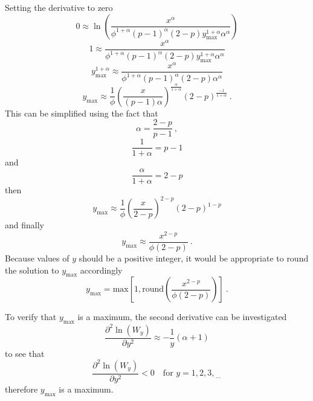 \documentclass[12pt, a4paper]{memoir}
\newcommand{\dotdotdot}{_{\phantom{.}\cdots}}
\begin{document}
Setting the derivative to zero
\begin{equation*}
0 \approx \ln\left(
\frac{x^\alpha}{\phi^{1+\alpha}(p-1)^\alpha(2-p)y_{\text{max}}^{1+\alpha}\alpha^\alpha}
\right)
\end{equation*}
\begin{equation*}
1 \approx 
\frac{x^\alpha}{\phi^{1+\alpha}(p-1)^\alpha(2-p)y_{\text{max}}^{1+\alpha}\alpha^\alpha}
\end{equation*}
\begin{equation*}
y_{\text{max}}^{1+\alpha} \approx 
\frac{x^\alpha}{\phi^{1+\alpha}(p-1)^\alpha(2-p)\alpha^\alpha}
\end{equation*}
\begin{equation*}
y_{\text{max}} \approx 
\frac{1}{\phi}
\left(
	\frac{x}{(p-1)\alpha}
\right)^{\frac{\alpha}{1+\alpha}}
(2-p)^{\frac{-1}{1+\alpha}} \ .
\end{equation*}
This can be simplified using the fact that 
\begin{equation*}
\alpha=\frac{2-p}{p-1} \ ,
\end{equation*}
\begin{equation*}
\frac{1}{1+\alpha} = p-1
\end{equation*}
and
\begin{equation*}
\frac{\alpha}{1+\alpha} = 2-p
\end{equation*}
then
\begin{equation*}
y_{\text{max}} \approx 
\frac{1}{\phi}
\left(
	\frac{x}{2-p}
\right)^{2-p}
(2-p)^{1-p}
\end{equation*}
and finally
\begin{equation}
y_{\text{max}} \approx \frac{x^{2-p}}{\phi(2-p)} \ .
\end{equation}
Because values of $y$ should be a positive integer, it would be appropriate to round the solution to $y_\text{max}$ accordingly
\begin{equation}
y_{\text{max}} = \text{max}\left[
1,\text{round}\left(\frac{x^{2-p}}{\phi(2-p)}\right)
\right] \ .
\end{equation}

To verify that $y_\text{max}$ is a maximum, the second derivative can be investigated
\begin{equation}
\frac{\partial^2\ln(W_y)}{\partial y^2}
\approx
-\frac{1}{y}(\alpha+1)
\end{equation}
to see that
\begin{equation}
\frac{\partial^2\ln(W_y)}{\partial y^2} < 0 \quad \text{for }y=1,2,3,\dotdotdot
\end{equation}
therefore $y_\text{max}$ is a maximum.
\end{document}
